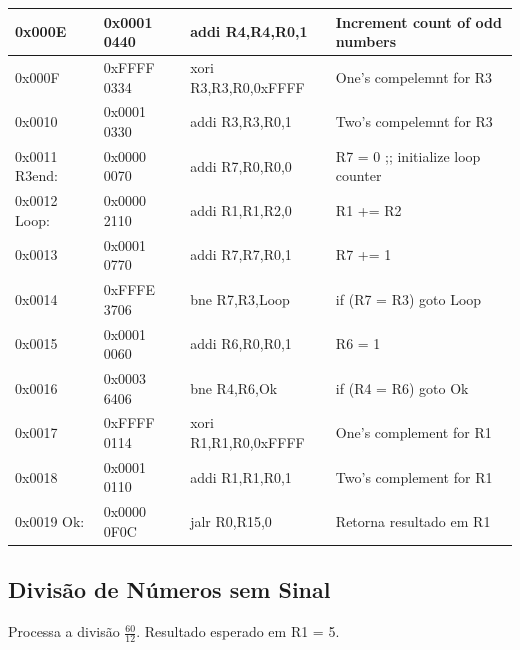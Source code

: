 \documentclass[12pt]{article}
\begin{document}
\begin{table}[H]
\begin{tabular}{|l|l|l|l|}
        0x000E        & 0x0001 0440 & addi R4,R4,R0,1      & Increment count of odd numbers                        \\\hline
        0x000F        & 0xFFFF 0334 & xori R3,R3,R0,0xFFFF & One's compelemnt for R3                               \\\hline
        0x0010        & 0x0001 0330 & addi R3,R3,R0,1      & Two's compelemnt for R3                               \\\hline
        0x0011 R3end: & 0x0000 0070 & addi R7,R0,R0,0      & R7 = 0 ;; initialize loop counter                     \\\hline
        0x0012 Loop:  & 0x0000 2110 & addi R1,R1,R2,0      & R1 += R2                                              \\\hline
        0x0013        & 0x0001 0770 & addi R7,R7,R0,1      & R7 += 1                                               \\\hline
        0x0014        & 0xFFFE 3706 & bne  R7,R3,Loop      & if (R7 \!= R3) goto Loop                              \\\hline
        0x0015        & 0x0001 0060 & addi R6,R0,R0,1      & R6 = 1                                                \\\hline
        0x0016        & 0x0003 6406 & bne  R4,R6,Ok        & if (R4 \!= R6) goto Ok                                \\\hline
        0x0017        & 0xFFFF 0114 & xori R1,R1,R0,0xFFFF & One's complement for R1                               \\\hline
        0x0018        & 0x0001 0110 & addi R1,R1,R0,1      & Two's complement for R1                               \\\hline
        0x0019 Ok:    & 0x0000 0F0C & jalr R0,R15,0        & Retorna resultado em R1                               \\\hline
    \end{tabular}\label{tab:programs:mult}
\end{table}

\subsection{Divisão de Números sem Sinal}\label{sec:programs:divu}

Processa a divisão $\frac{60}{12}$. Resultado esperado em R1 = 5.
\end{document}
